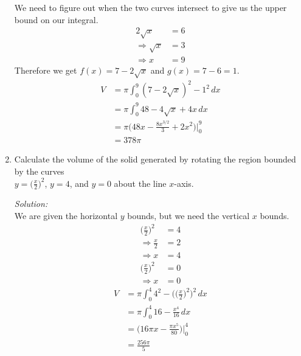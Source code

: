 \documentclass[16pt]{article}
\theoremstyle{remark}
\begin{document}
\begin{enumerate}
\begin{mdframed}[style=TheoremFrame]
We need to figure out when the two curves intersect to give us the upper bound on our integral.
\begin{align*}
2\sqrt{x} &= 6\\
\Rightarrow \sqrt{x} &= 3\\
\Rightarrow x &= 9
\end{align*}
Therefore we get $f(x) = 7 - 2\sqrt{x}$ and $g(x) = 7-6 = 1$.
\begin{align*}
V&= \pi \int_0^9 (7-2\sqrt{x})^2 - 1^2 \, dx\\
&= \pi \int_0^9 48 - 4 \sqrt{x}+4x \, dx\\
&= \pi \bigg(48x - \frac{8x^{3/2}}{3}+2x^2 \bigg) \bigg|_0^9\\
&= 378\pi
\end{align*}
\end{mdframed}
\newpage\item Calculate the volume of the solid generated by rotating the region bounded by the curves\\ $\displaystyle{y=\bigg(\frac{x}{2}\bigg)^2}$, $y=4$, and $y=0$ about the line $x$-axis.
\begin{mdframed}[style=TheoremFrame]
\textit{Solution:}\\

We are given the horizontal $y$ bounds, but we need the vertical $x$ bounds.
\begin{align*}
 \bigg(\frac{x}{2}\bigg)^2 &= 4\\
\Rightarrow \frac{x}{2} &= 2\\
\Rightarrow x &= 4
\end{align*}
\begin{align*}
\bigg(\frac{x}{2}\bigg)^2 &= 0\\
\Rightarrow x &= 0
\end{align*}
\begin{align*}
V&= \pi \int_0^4  4^2 - \bigg(\bigg(\frac{x}{2}\bigg)^2 \bigg)^2 \, dx\\
&= \pi \int_0^4 16 -\frac{x^4}{16} \, dx\\
&= \bigg(16\pi x - \frac{\pi x^5}{80} \bigg) \bigg|_0^4\\
&= \frac{256\pi}{5}
\end{align*}
\end{mdframed}
\end{enumerate}
\end{document}
